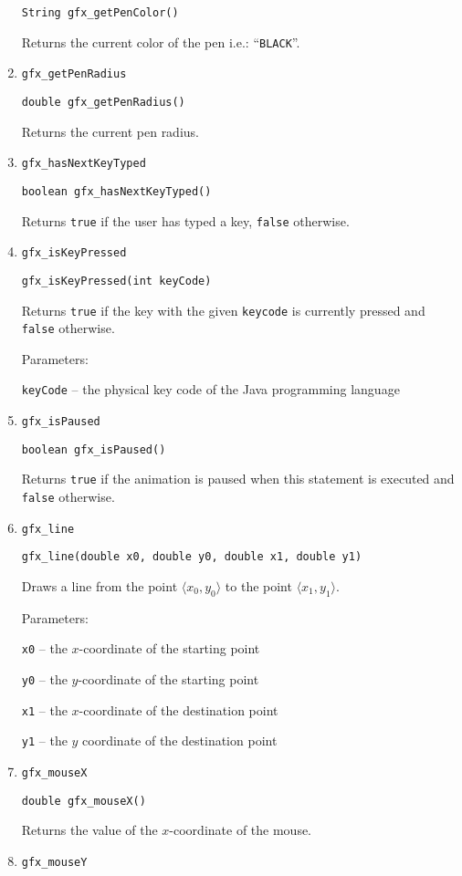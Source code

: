 \begin{enumerate}
      \texttt{String gfx\_getPenColor()}

      Returns the current color of the pen i.e.: ``\texttt{BLACK}''.
\item \texttt{gfx\_getPenRadius}

      \texttt{double gfx\_getPenRadius()}

      Returns the current pen radius.
\item \texttt{gfx\_hasNextKeyTyped}

      \texttt{boolean gfx\_hasNextKeyTyped()}

      Returns \texttt{true} if the user has typed a key, \texttt{false} otherwise.
\item \texttt{gfx\_isKeyPressed}

      \texttt{gfx\_isKeyPressed(int keyCode)}

      Returns \texttt{true} if the key with the given \texttt{keycode} is currently pressed and
      \texttt{false} otherwise. 

      Parameters:

      \texttt{keyCode} -- the physical key code of the Java programming language
\item \texttt{gfx\_isPaused}

      \texttt{boolean gfx\_isPaused()}

      Returns \texttt{true} if the animation is paused when this statement is executed and
      \texttt{false} otherwise.
\item \texttt{gfx\_line}

      \texttt{gfx\_line(double x0, double y0, double x1, double y1)}

      Draws a line from the point $\langle x_0, y_0 \rangle$ to the point $\langle x_1, y_1 \rangle$.

      Parameters:

      \texttt{x0} -- the $x$-coordinate of the starting point 

      \texttt{y0} -- the $y$-coordinate of the starting point 

      \texttt{x1} -- the $x$-coordinate of the destination point 

      \texttt{y1} -- the $y$ coordinate of the destination point
\item \texttt{gfx\_mouseX}

      \texttt{double gfx\_mouseX()}

      Returns the value of the $x$-coordinate of the mouse.
\item \texttt{gfx\_mouseY}


\end{enumerate}
